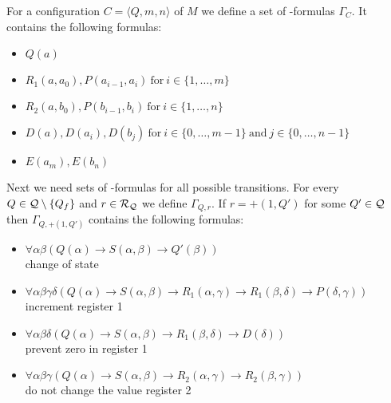 For a configuration $C=\langle Q,m,n\rangle$ of $M$ we define a set of \SysP-formulas $\Gamma_C$. It contains the following formulas:
\begin{itemize}
	\item $Q(a)$
	\item $R_1(a,a_0),P(a_{i-1},a_i)~\text{for}~i\in\{1,\dots,m\}$
	\item $R_2(a,b_0),P(b_{i-1},b_i)~\text{for}~i\in\{1,\dots,n\}$
	\item $D(a),D(a_i),D(b_j)~\text{for}~i\in\{0,\dots,m-1\}~\text{and}~j\in\{0,\dots,n-1\}$
	\item $E(a_m),E(b_n)$
\end{itemize}
Next we need sets of \SysP-formulas for all possible transitions.
For every $Q\in\mathcal{Q}\setminus\{Q_f\}$ and $r\in\mathcal{R}_{\mathcal{Q}}$ we define $\Gamma_{Q,r}$.
If $r=+(1,Q')$ for some $Q'\in\mathcal{Q}$ then $\Gamma_{Q,+(1,Q')}$ contains the following formulas:
\begin{itemize}
	\item $\forall\alpha\beta(Q(\alpha)\to S(\alpha,\beta)\to Q'(\beta))$ \\change of state
	\item $\forall\alpha\beta\gamma\delta(Q(\alpha)\to S(\alpha,\beta)\to R_1(\alpha,\gamma)\to R_1(\beta,\delta)\to P(\delta,\gamma))$\\increment register 1
	\item $\forall\alpha\beta\delta(Q(\alpha)\to S(\alpha,\beta)\to R_1(\beta,\delta)\to D(\delta))$ \\prevent zero in register 1
	\item $\forall\alpha\beta\gamma(Q(\alpha)\to S(\alpha,\beta)\to R_2(\alpha,\gamma)\to R_2(\beta,\gamma))$ \\do not change the value register 2
\end{itemize}

